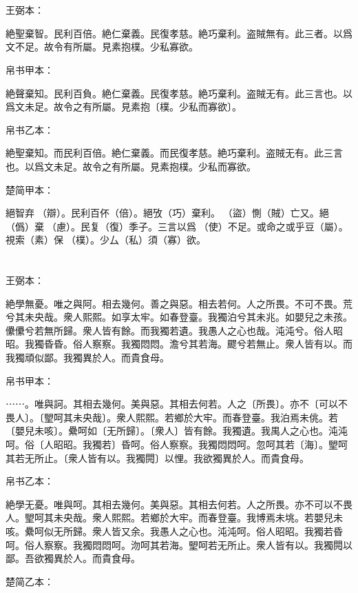\documentclass[a5paper]{ctexbook}
\begin{document}
    \chapter{}
    王弼本：

    絶聖棄智。民利百倍。絶仁棄義。民復孝慈。絶巧棄利。盗賊無有。此三者。以爲文不足。故令有所屬。見素抱樸。少私寡欲。

    
    帛书甲本：

    絶聲棄知。民利百負。絶仁棄義。民復孝慈。絶巧棄利。盗賊无有。此三言也。以爲文未足。故令之有所屬。見素抱〔樸。少私而寡欲〕。

    帛书乙本：

    絶聖棄知。而民利百倍。絶仁棄義。而民復孝慈。絶巧棄利。盗賊无有。此三言也。以爲文未足。故令之有所屬。見素抱樸。少私而寡欲。

    楚简甲本：

    絕智弃󶴉（辯）。民利百伓（倍）。絕攷（巧）棄利。󶴊（盜）惻（賊）亡又。絕𢠿（僞）棄󶴍（慮）。民复（復）季子。三言以爲󶴎（使）不足。或命之或乎豆（屬）。視索（素）保󶴏（樸）。少厶（私）須（寡）欲。

    \chapter{}
    王弼本：

    絶學無憂。唯之與阿。相去幾何。善之與惡。相去若何。人之所畏。不可不畏。荒兮其未央哉。衆人熙熙。如享太牢。如春登臺。我獨泊兮其未兆。如嬰兒之未孩。儽儽兮若無所歸。衆人皆有餘。而我獨若遺。我愚人之心也哉。沌沌兮。俗人昭昭。我獨昏昏。俗人察察。我獨悶悶。澹兮其若海。飂兮若無止。衆人皆有以。而我獨頑似鄙。我獨異於人。而貴食母。

    
    帛书甲本：

    ⋯⋯。唯與訶。其相去幾何。美與惡。其相去何若。人之〔所畏〕。亦不〔可以不畏人〕。〔朢呵其未央哉〕。衆人熙熙。若鄉於大牢。而春登臺。我泊焉未佻。若〔嬰兒未咳〕。纍呵如〔无所歸〕。〔衆人〕皆有餘。我獨遺。我禺人之心也。沌沌呵。俗〔人昭昭。我獨若〕昏呵。俗人察察。我獨悶悶呵。忽呵其若〔海〕。朢呵其若无所止。〔衆人皆有以。我獨䦎〕以悝。我欲獨異於人。而貴食母。

    帛书乙本：

    絶學无憂。唯與呵。其相去幾何。美與惡。其相去何若。人之所畏。亦不可以不畏人。朢呵其未央哉。衆人熙熙。若鄉於大牢。而春登臺。我博焉未垗。若嬰兒未咳。纍呵似无所歸。衆人皆又余。我愚人之心也。沌沌呵。俗人昭昭。我獨若昏呵。俗人察察。我獨悶悶呵。沕呵其若海。朢呵若无所止。衆人皆有以。我獨䦎以鄙。吾欲獨異於人。而貴食母。

    楚简乙本：
\end{document}
